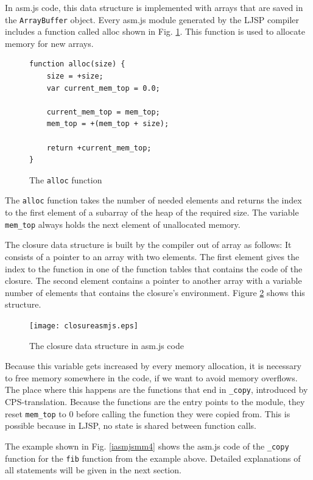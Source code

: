 \documentclass[11pt]{report}
\begin{document}
In asm.js code, this data structure is implemented with arrays that are saved in the \texttt{ArrayBuffer} object. Every asm.js module generated by the LJSP compiler includes a function called alloc shown in Fig. \ref{iasmjsmm3}. This function is used to allocate memory for new arrays.

\begin{figure}[ht]
\begin{lstlisting}
function alloc(size) {
    size = +size;
    var current_mem_top = 0.0;

    current_mem_top = mem_top;
    mem_top = +(mem_top + size);

    return +current_mem_top;
}
\end{lstlisting}
\caption{The \texttt{alloc} function}
\label{iasmjsmm3}
\end{figure}

The \texttt{alloc} function takes the number of needed elements and returns the index to the first element of a subarray of the heap of the required size. The variable \texttt{mem_top} always holds the next element of unallocated memory.

The closure data structure is built by the compiler out of array as follows: It consists of a pointer to an array with two elements. The first element gives the index to the function in one of the function tables that contains the code of the closure. The second element contains a pointer to another array with a variable number of elements that contains the closure's environment. Figure \ref{asmjsclosure} shows this structure.

\begin{figure}[ht]
\begin{center}
\texttt{[image: closureasmjs.eps]}
\end{center}
\caption{The closure data structure in asm.js code}
\label{asmjsclosure}
\end{figure}


Because this variable gets increased by every memory allocation, it is necessary to free memory somewhere in the code, if we want to avoid memory overflows. The place where this happens are the functions that end in \texttt{_copy}, introduced by CPS-translation. Because the functions are the entry points to the module, they reset \texttt{mem_top} to $0$ before calling the function they were copied from. This is possible because in LJSP, no state is shared between function calls.

The example shown in Fig. \ref{iasmjsmm4} shows the asm.js code of the \texttt{_copy} function for the \texttt{fib} function from the example above. Detailed explanations of all statements will be given in the next section.
\end{document}
